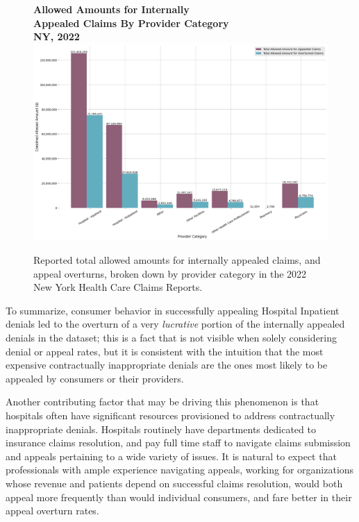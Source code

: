 \documentclass[12pt, a4paper,twoside,parskip=full]{report}
\theoremstyle{plain} %
\theoremstyle{definition} %
\theoremstyle{remark} %
\numberwithin{equation}{chapter}
\begin{document}
		\begin{figure}[h!]
			\centering
			\textbf{Allowed Amounts for Internally}\\
			\textbf{Appealed Claims By Provider Category}\\ 
			\textbf{NY, 2022}\\
			\includegraphics[width=\columnwidth]{images/ny_claim_reports/allowed_amts_by_provider_category_stacked.png}
			\caption{Reported total allowed amounts for internally appealed claims, and appeal overturns, broken down by provider category in the 2022 New York Health Care Claims Reports.}
			\label{nyappealsallowedamts}
		\end{figure}
	
		To summarize, consumer behavior in successfully appealing Hospital Inpatient denials led to the overturn of a very \emph{lucrative} portion of the internally appealed denials in the dataset; this is a fact that is not visible when solely considering denial or appeal rates, but it is consistent with the intuition that the most expensive contractually inappropriate denials are the ones most likely to be appealed by consumers or their providers.
		
		Another contributing factor that may be driving this phenomenon is that hospitals often have significant resources provisioned to address contractually inappropriate denials. Hospitals routinely have departments dedicated to insurance claims resolution, and pay full time staff to navigate claims submission and appeals pertaining to a wide variety of issues. It is natural to expect that professionals with ample experience navigating appeals, working for organizations whose revenue and patients depend on successful claims resolution, would both appeal more frequently than would individual consumers, and fare better in their appeal overturn rates.
		
\end{document}
